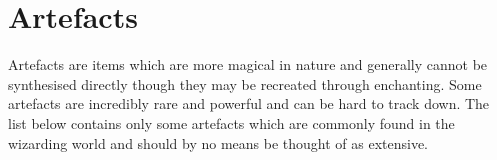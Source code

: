  
\normalsize


\section{Artefacts}

Artefacts are items which are more magical in nature\comma{} and generally cannot be synthesised directly\comma{} though they may be recreated through enchanting. Some artefacts are incredibly rare and powerful\comma{} and can be hard to track down. The list below contains only some artefacts which are commonly found in the wizarding world\comma{} and should by no means be thought of as extensive. 
\def\q{4}
